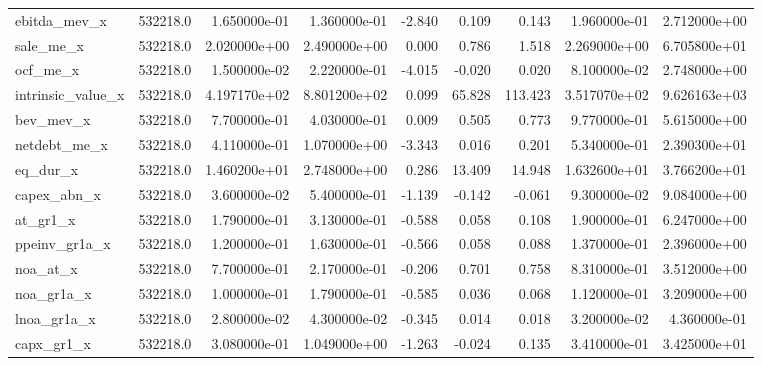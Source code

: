 \documentclass[12pt]{article}
\begin{document}
\begin{landscape}
\begin{longtable}{|l|r|r|r|r|r|r|r|r|}
ebitda\_mev\_x           &  532218.0 &  1.650000e-01 &  1.360000e-01 &      -2.840 &        0.109 &        0.143 &  1.960000e-01 &  2.712000e+00 \\
sale\_me\_x              &  532218.0 &  2.020000e+00 &  2.490000e+00 &       0.000 &        0.786 &        1.518 &  2.269000e+00 &  6.705800e+01 \\
ocf\_me\_x               &  532218.0 &  1.500000e-02 &  2.220000e-01 &      -4.015 &       -0.020 &        0.020 &  8.100000e-02 &  2.748000e+00 \\
intrinsic\_value\_x      &  532218.0 &  4.197170e+02 &  8.801200e+02 &       0.099 &       65.828 &      113.423 &  3.517070e+02 &  9.626163e+03 \\
bev\_mev\_x              &  532218.0 &  7.700000e-01 &  4.030000e-01 &       0.009 &        0.505 &        0.773 &  9.770000e-01 &  5.615000e+00 \\
netdebt\_me\_x           &  532218.0 &  4.110000e-01 &  1.070000e+00 &      -3.343 &        0.016 &        0.201 &  5.340000e-01 &  2.390300e+01 \\
eq\_dur\_x               &  532218.0 &  1.460200e+01 &  2.748000e+00 &       0.286 &       13.409 &       14.948 &  1.632600e+01 &  3.766200e+01 \\
capex\_abn\_x            &  532218.0 &  3.600000e-02 &  5.400000e-01 &      -1.139 &       -0.142 &       -0.061 &  9.300000e-02 &  9.084000e+00 \\
at\_gr1\_x               &  532218.0 &  1.790000e-01 &  3.130000e-01 &      -0.588 &        0.058 &        0.108 &  1.900000e-01 &  6.247000e+00 \\
ppeinv\_gr1a\_x          &  532218.0 &  1.200000e-01 &  1.630000e-01 &      -0.566 &        0.058 &        0.088 &  1.370000e-01 &  2.396000e+00 \\
noa\_at\_x               &  532218.0 &  7.700000e-01 &  2.170000e-01 &      -0.206 &        0.701 &        0.758 &  8.310000e-01 &  3.512000e+00 \\
noa\_gr1a\_x             &  532218.0 &  1.000000e-01 &  1.790000e-01 &      -0.585 &        0.036 &        0.068 &  1.120000e-01 &  3.209000e+00 \\
lnoa\_gr1a\_x            &  532218.0 &  2.800000e-02 &  4.300000e-02 &      -0.345 &        0.014 &        0.018 &  3.200000e-02 &  4.360000e-01 \\
capx\_gr1\_x             &  532218.0 &  3.080000e-01 &  1.049000e+00 &      -1.263 &       -0.024 &        0.135 &  3.410000e-01 &  3.425000e+01 \\

\end{longtable}
\end{landscape}
\end{document}
